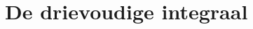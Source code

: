 \documentclass[12pt]{article}
\begin{document}
    \maketitle

    \section{De drievoudige integraal}
\end{document}
